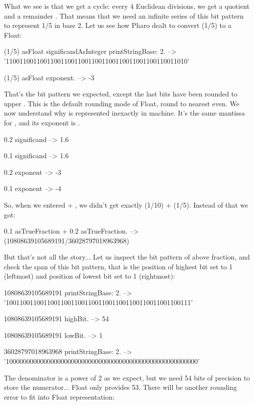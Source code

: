 \documentclass[a4paper,10pt,twoside]{book}
\begin{document}
What we see is that we get a cycle: every 4 Euclidean divisions, we get a quotient  and a remainder . That means that we need an infinite series of this bit pattern  to represent 1/5 in base 2. Let us see how Pharo dealt to convert (1/5) to a Float:

 \begin{code}{}
(1/5) asFloat significandAsInteger printStringBase: 2.
	--> '11001100110011001100110011001100110011001100110011010'
	
(1/5) asFloat exponent.
	--> -3
\end{code}

That's the bit pattern we expected, except the last bits  have been rounded to upper . This is the default rounding mode of Float, round to nearest even. We now understand why  is represented inexactly in machine. It's the same mantissa for , and its exponent is .

\begin{code}{} 
0.2 significand
 	--> 1.6
	
0.1 significand 
	--> 1.6	
	
0.2 exponent
	--> -3
	
0.1 exponent
	--> -4
\end{code}


So, when we entered  + , we didn't get exactly (1/10) + (1/5).
Instead of that we got:

 \begin{code}{}
0.1 asTrueFraction + 0.2 asTrueFraction.
	-->  (10808639105689191/36028797018963968)
\end{code}

But that's not all the story... Let us inspect the bit pattern of above fraction, and check the span of this bit pattern, that is the position of highest bit set to 1 (leftmost) and position of lowest bit set to 1 (rightmost):
 \begin{code}{}
10808639105689191 printStringBase: 2.
	-->  '100110011001100110011001100110011001100110011001100111'
	
10808639105689191 highBit.
	-->  54
	
10808639105689191 lowBit.
	-->  1

36028797018963968 printStringBase: 2.
	-->  '10000000000000000000000000000000000000000000000000000000'
\end{code}

The denominator is a power of 2 as we expect, but we need 54 bits of precision to store the numerator... Float only provides 53. There will be another rounding error to fit into Float representation:
\end{document}
